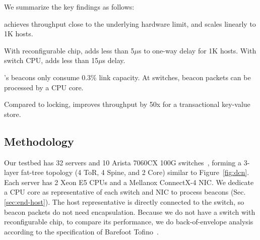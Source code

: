 We summarize the key findings as follows:


\sys achieves throughput close to the underlying hardware limit, and scales linearly to 1K hosts.

With reconfigurable chip, \sys adds less than 5$\mu$s to one-way delay for 1K hosts. With switch CPU, \sys adds less than 15$\mu$s delay.

\sys's beacons only consume 0.3\% link capacity. At switches, beacon packets can be processed by a CPU core.



 Compared to locking, \sys{} improves throughput by 50x for a transactional key-value store.

\subsection{Methodology}
\label{sec:testbed}

Our testbed has 32 servers and 10 Arista 7060CX 100G switches~\cite{arista}, forming a 3-layer fat-tree topology (4 ToR, 4 Spine, and 2 Core) similar to Figure~\ref{fig:dcn}.
Each server has 2 Xeon E5 CPUs and a Mellanox ConnectX-4 NIC. %
We dedicate a CPU core as representative of each switch and NIC to process beacons (Sec.\ref{sec:end-host}). The host representative is directly connected to the switch, so beacon packets do not need encapsulation.
Because we do not have a switch with reconfigurable chip, to compare its performance, we do back-of-envelope analysis according to the specification of Barefoot Tofino~\cite{tofino}.


